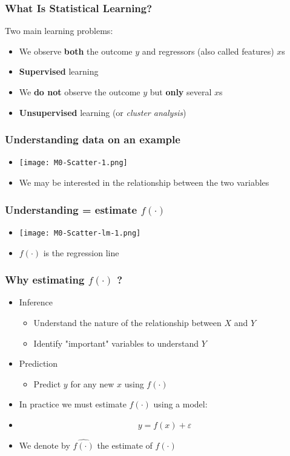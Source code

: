 \documentclass[xcolor=x11names,compress, aspectratio=169]{beamer}
\renewcommand{\(}{\begin{columns}}
\renewcommand{\)}{\end{columns}}
\newcommand{\<}[1]{\begin{column}{#1}}
\renewcommand{\>}{\end{column}}
\begin{document}
\begin{frame} %
\frametitle{What Is Statistical Learning?}
Two main learning problems:
\begin{itemize}
  \item<+->[]We observe \textbf{both} the outcome $y$ and regressors (also called features) $x$s
   \item<+-> \textbf{Supervised} learning
  \item<+->[] We \textbf{do not} observe the outcome $y$ but\textbf{ only} several $x$s
  \item<+-> \textbf{Unsupervised} learning (or \textit{cluster analysis})
 \end{itemize}
\end{frame}



\begin{frame} %
\frametitle{Understanding data on an example}
 \begin{itemize}
  \item<+->[] \texttt{[image: M0-Scatter-1.png]}
  \item<+->[]  We may be interested in the relationship between the two variables
 \end{itemize}
\end{frame}



\begin{frame} %
\frametitle{Understanding = estimate $f(\cdot)$ }
 \begin{itemize}
  \item<+->[] \texttt{[image: M0-Scatter-lm-1.png]}
  \item<+->[]  $f(\cdot)$ is the regression line
 \end{itemize}
\end{frame}


\begin{frame} %
\frametitle{Why estimating $f(\cdot)$ ?}
 \begin{itemize}
  \item<+-> Inference
   \begin{itemize}
  \item<+->[] Understand the nature of the relationship between $X$ and $Y$
  \item<+->[] Identify  "important" variables to understand $Y$
 \end{itemize}
  \item<+-> Prediction
   \begin{itemize}
  \item<+->[] Predict $y$ for any new $x$ using $f(\cdot)$
 \end{itemize}
 \item<+-> In practice we must estimate  $f(\cdot)$ using a model:
 \item<+->[] $$ y = f(x) + \varepsilon $$
 \item<+->[] We denote by $\widehat{f(\cdot)}$ the estimate of $f(\cdot)$
 \end{itemize}
\end{frame}
\end{document}

